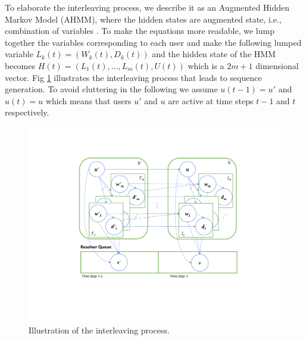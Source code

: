 \documentclass[conference]{IEEEtran}
\begin{document}
	To elaborate the interleaving process, we describe it as an Augmented Hidden Markov Model (AHMM), where the hidden states are augmented state, i.e., combination of variables \cite{minot2014separation}. 
	To make the equations more readable, we lump together the variables corresponding to each user and make the following lumped variable $L_k(t) = (W_{k}(t), D_{k}(t))$ and the hidden state of the HMM becomes $H(t) = (L_1(t), \dots, L_m(t), U(t))$ which is a $2m +1$ dimensional vector.
	Fig \ref{fig:rq} illustrates the interleaving process that leads to sequence generation.
	To avoid cluttering in the following we assume $u(t-1) = u'$ and $u(t) = u$ which means that users $u'$ and $u$ are active at time steps $t-1$ and $t$ respectively. 
	\begin{figure}
		\centering
		\includegraphics[width=.45\textwidth]{./img/hsmm-q2}
		\caption{Illustration of the interleaving process.}
		\label{fig:rq}
	\end{figure} 
	
\end{document}
